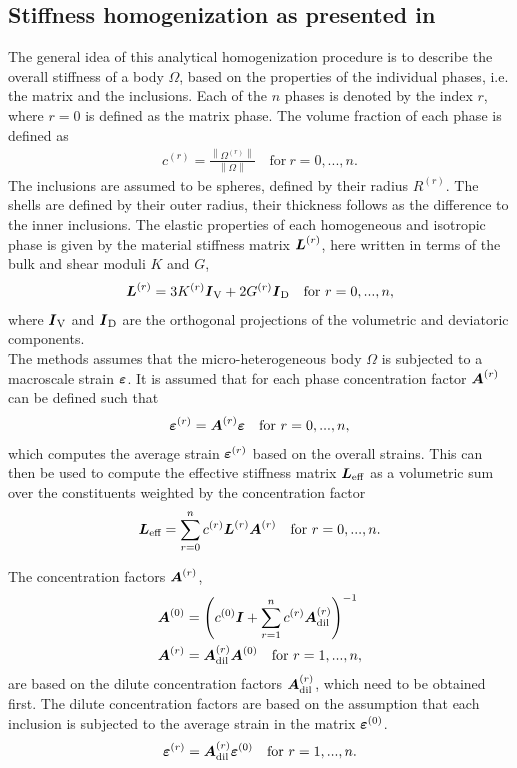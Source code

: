 \subsection{Stiffness homogenization as presented in \cite{nee_2012_ammf}}
The general idea of this analytical homogenization procedure is to describe the overall stiffness of a body $\Omega$, based on the properties of the individual phases, i.e. the matrix and the inclusions.
Each of the $n$ phases is denoted by the index $r$, where $r = 0$ is defined as the matrix phase.
The volume fraction of each phase is defined as
\begin{align}
	c^{(r)} = \frac{\left\|\Omega^{(r)} \right\|}{\left\|\Omega\right\|} \quad  \text{for}~ r = 0, ..., n.
\end{align}
The inclusions are assumed to be spheres, defined by their radius $R^{(r)}$.
The shells are defined by their outer radius, their thickness follows as the difference to the inner inclusions.
The elastic properties of each homogeneous and isotropic phase is given by the material stiffness matrix $\boldsymbol{L}^{(r)}$, here written in terms of the bulk and shear moduli $K$ and $G$,
\begin{align}
	\boldsymbol{L}^{(r)}= 3 K^{(r)} \boldsymbol{I}_{\text{V}} + 2 G^{(r)} \boldsymbol{I}_{\text{D}}  \quad \text{for}~ r = 0, ..., n, \label{eq:Lr}
\end{align}
where $\boldsymbol{I}_{\text{V}}$ and $\boldsymbol{I}_{\text{D}}$ are the orthogonal projections of the volumetric and deviatoric components.\\
The methods assumes that the micro-heterogeneous body $\Omega$ is subjected to a macroscale strain $\boldsymbol{\varepsilon}$.
It is assumed that for each phase concentration factor $\boldsymbol{A}^{(r)}$ can be defined such that
\begin{align}
	\boldsymbol{\varepsilon}^{(r)} = \boldsymbol{A}^{(r)}\boldsymbol{\varepsilon} \quad  \text{for}~ r = 0, ..., n, \label{eq:strainaverage}
\end{align}
which computes the average strain $\boldsymbol{\varepsilon}^{(r)}$ based on the overall strains.
This can then be used to compute the effective stiffness matrix $\boldsymbol{L}_{\text{eff}}$ as a volumetric sum over the constituents weighted by the concentration factor 
\begin{align}
	\boldsymbol{L}_{\text{eff}} = \sum_{r=0}^{n} c^{(r)}\boldsymbol{L}^{(r)}\boldsymbol{A}^{(r)} \quad  \text{for}~ r = 0, ..., n.\label{eq:Leff}
\end{align}

The concentration factors $\boldsymbol{A}^{(r)}$,
\begin{align}
	\boldsymbol{A}^{(0)} &= \left( c^{(0)}\boldsymbol{I} + \sum^{n}_{r=1} c^{(r)} \boldsymbol{A}_{\text{dil}}^{(r)}\right)^{-1}\label{eq:A0}\\
	\boldsymbol{A}^{(r)} &= \boldsymbol{A}^{(r)}_{\text{dil}}\boldsymbol{A}^{(0)}\quad  \text{for}~ r = 1, ..., n,
\end{align}
are based on the dilute concentration factors $\boldsymbol{A}^{(r)}_{\text{dil}}$, which need to be obtained first.
The dilute concentration factors are based on the assumption that each inclusion is subjected to the average strain in the matrix $\boldsymbol{\varepsilon}^{(0)}$.
\begin{align}
	\boldsymbol{\varepsilon}^{(r)} = \boldsymbol{A}_{\text{dil}}^{(r)}\boldsymbol{\varepsilon}^{(0)} \quad  \text{for}~ r = 1, ..., n. 
\end{align}


